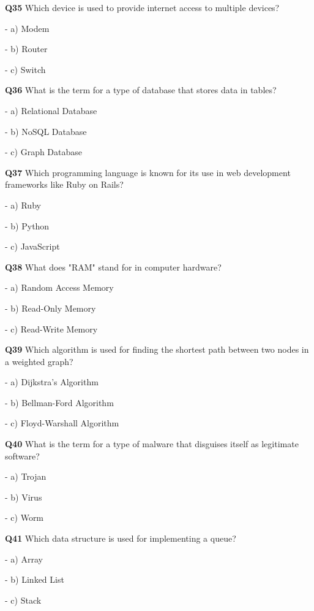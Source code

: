\textbf{Q35} Which device is used to provide internet access to multiple devices?\par
\quad - a) Modem\par
\quad - b) Router\par
\quad - c) Switch\par

\textbf{Q36} What is the term for a type of database that stores data in tables?\par
\quad - a) Relational Database\par
\quad - b) NoSQL Database\par
\quad - c) Graph Database\par

\textbf{Q37} Which programming language is known for its use in web development frameworks like Ruby on Rails?\par
\quad - a) Ruby\par
\quad - b) Python\par
\quad - c) JavaScript\par

\textbf{Q38} What does "RAM" stand for in computer hardware?\par
\quad - a) Random Access Memory\par
\quad - b) Read-Only Memory\par
\quad - c) Read-Write Memory\par

\textbf{Q39} Which algorithm is used for finding the shortest path between two nodes in a weighted graph?\par
\quad - a) Dijkstra's Algorithm\par
\quad - b) Bellman-Ford Algorithm\par
\quad - c) Floyd-Warshall Algorithm\par

\textbf{Q40} What is the term for a type of malware that disguises itself as legitimate software?\par
\quad - a) Trojan\par
\quad - b) Virus\par
\quad - c) Worm\par

\textbf{Q41} Which data structure is used for implementing a queue?\par
\quad - a) Array\par
\quad - b) Linked List\par
\quad - c) Stack\par

